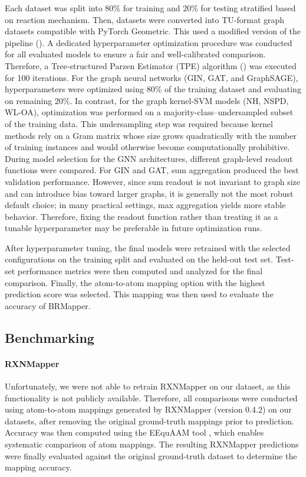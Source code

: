 \documentclass[a4paper,12pt]{article} %
\begin{document}
Each dataset was split into 80\% for training and 20\% for testing stratified based on reaction mechanism. Then, datasets were converted into TU-format graph datasets compatible with PyTorch Geometric. This used a modified version of the pipeline (\cite{TUDataset}). A dedicated hyperparameter optimization procedure was conducted for all evaluated models to ensure a fair and well-calibrated comparison. Therefore, a Tree-structured Parzen Estimator (TPE) algorithm (\cite{NIPS2011_86e8f7ab}) was executed for 100 iterations. For the graph neural networks (GIN, GAT, and GraphSAGE), hyperparameters were optimized using 80\% of the training dataset and evaluating on remaining 20\%. In contrast, for the graph kernel-SVM models (NH, NSPD, WL-OA), optimization was performed on a majority-class–undersampled subset of the training data. This undersampling step was required because kernel methods rely on a Gram matrix whose size grows quadratically with the number of training instances and would otherwise become computationally prohibitive. During model selection for the GNN architectures, different graph-level readout functions were compared. For GIN and GAT, sum aggregation produced the best validation performance. However, since sum readout is not invariant to graph size and can introduce bias toward larger graphs, it is generally not the most robust default choice; in many practical settings, max aggregation yields more stable behavior. Therefore, fixing the readout function rather than treating it as a tunable hyperparameter may be preferable in future optimization runs.

After hyperparameter tuning, the final models were retrained with the selected configurations on the training split and evaluated on the held-out test set. Test-set performance metrics were then computed and analyzed for the final comparison. Finally, the atom-to-atom mapping option with the highest prediction score was selected. This mapping was then used to evaluate the accuracy of BRMapper.


\subsection{Benchmarking}

\paragraph{RXNMapper}

Unfortunately, we were not able to retrain RXNMapper on our dataset, as this functionality is not publicly available. Therefore, all comparisons were conducted using atom-to-atom mappings generated by RXNMapper (version 0.4.2) \cite{schwaller2021rxnmapper} on our datasets, after removing the original ground-truth mappings prior to prediction. Accuracy was then computed using the EEquAAM tool \cite{Laffitte:2023}, which enables systematic comparison of atom mappings. The resulting RXNMapper predictions were finally evaluated against the original ground-truth dataset to determine the mapping accuracy.
\end{document}

